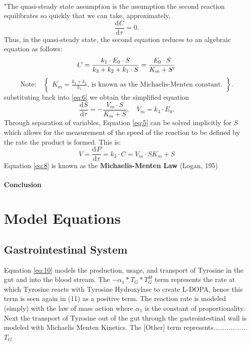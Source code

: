 \documentclass[smallextended]{svjour3}
\newcommand{\od}[3][]{\ensuremath{\frac{\mathrm{d}^{#1} {#2}}{\mathrm{d}{#3}^{#1}}}}
\newcommand{\ZeroNote}[1]{$$\text{Note:}\quad\left\{\begin{aligned} {#1} \end{aligned}\right\}.$$}
\begin{document}
\paragraph{}
"The quasi-steady state assumption is the assumption the second reaction equilibrates so quickly that we can take, approximately, 
$$\od{C}{\tau} = 0.$$
Thus, in the quasi-steady state, the second equation reduces to an algebraic equation as follows: 
$$
C = \frac{k_1 \cdot E_0 \cdot S}{k_3 + k_2 + k_1 \cdot S}
\\
= \frac{E_0 \cdot S}{K_m + S'}
$$
\ZeroNote{K_m = \frac{k_3 + k_2}{k_1} \text{, is known as the Michaelis-Menten constant.}}
%
substituting back into \ref{eq:6} we obtain the simplified equation
% 
$$\od{S}{\tau} = -\frac{V_m \cdot S}{K_m + S}, \quad V_m=k_3 \cdot E_0.$$
%
Through separation of variables, Equation \ref{eq:5} can be solved implicitly for $S$ which allows for the measurement of the speed of the reaction to be defined by the rate the product is formed.  This is: 
\begin{equation}
\label{eq:9}
V = \od{P}{\tau} = k_3 \cdot C = {V_m \cdot S}{K_m + S}
\end{equation}
Equation \ref{eq:8} is known as the \textbf{Michaelis-Menten Law} (Logan, 195)
\paragraph{Conclusion} \hfill

\section{ Model Equations}
\label{sec:4}
\subsection{Gastrointestinal System} \hfill

\indent Equation \ref{eq:10} models the production, usage, and transport of Tyrosine in the gut and into the blood stream. The $-\alpha_1*T_G*T_G^H$ term represents the rate at which Tyrosine reacts with Tyrosine Hydroxylase to create L-DOPA, hence this term is seen again in (11) as a positive term. The reaction rate is modeled (simply) with the law of mass action where $\alpha_1$ is the constant of proportionality. Next the transport of Tyrosine out of the gut through the gastrointestinal wall is modeled with Michaelis Menten Kinetics. The [Other] term represents..................  $T_G$
\end{document}
